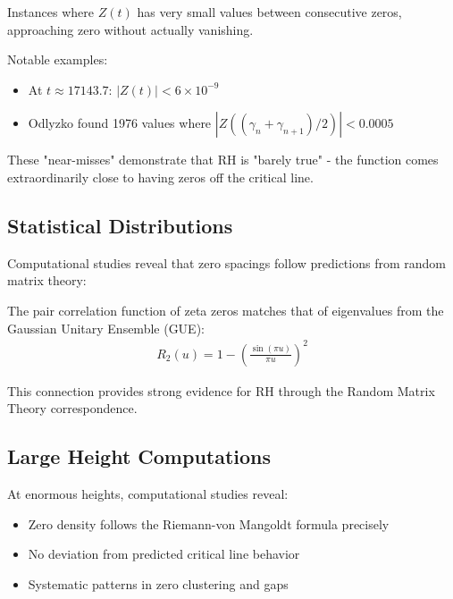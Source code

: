 \begin{definition}
Instances where $Z(t)$ has very small values between consecutive zeros, approaching zero without actually vanishing.
\end{definition}

Notable examples:
\begin{itemize}
\item At $t \approx 17143.7$: $|Z(t)| < 6 \times 10^{-9}$
\item Odlyzko \cite{odlyzko1985} found 1976 values where $|Z((\gamma_n + \gamma_{n+1})/2)| < 0.0005$
\end{itemize}

\begin{remark}
These "near-misses" demonstrate that RH is "barely true" - the function comes extraordinarily close to having zeros off the critical line.
\end{remark}

\subsection{Statistical Distributions}

Computational studies reveal that zero spacings follow predictions from random matrix theory:

\begin{theorem}
The pair correlation function of zeta zeros matches that of eigenvalues from the Gaussian Unitary Ensemble (GUE):
\begin{align}
R_2(u) = 1 - \left(\frac{\sin(\pi u)}{\pi u}\right)^2
\end{align}
\end{theorem}

This connection provides strong evidence for RH through the Random Matrix Theory correspondence.

\subsection{Large Height Computations}

At enormous heights, computational studies reveal:

\begin{itemize}
\item Zero density follows the Riemann-von Mangoldt formula precisely
\item No deviation from predicted critical line behavior
\item Systematic patterns in zero clustering and gaps
\end{itemize}

